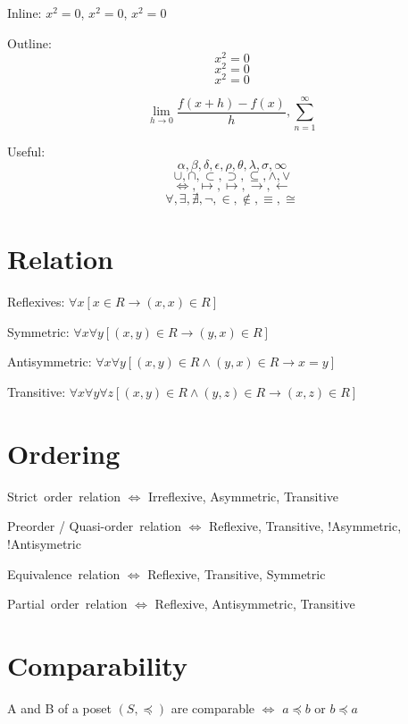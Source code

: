 \documentclass{article}
\begin{document}
Inline: \(x^2 = 0\), $x^2 = 0$, \begin{math}x^2 = 0\end{math}

Outline:
\[ x^2 = 0 \]
\begin{displaymath} x^2 = 0 \end{displaymath}
\begin{equation} x^2 = 0 \end{equation}

\[
    \lim_{h \to 0 } \frac{f(x+h)-f(x)}{h}, \sum_{n = 1}^{\infty}
\]

Useful:
\[\alpha, \beta, \delta, \epsilon, \rho, \theta, \lambda, \sigma, \infty\]
\[\cup, \cap, \subset, \supset, \subseteq, \wedge, \vee\]
\[\iff, \mapsto, \longmapsto, \to, \gets\]
\[\forall, \exists, \nexists, \neg, \in, \notin, \equiv, \cong\]

\section{Relation}

Reflexives: $\forall x [x \in R \to (x,x) \in R]$

Symmetric: $\forall x \forall y [(x,y) \in R \to (y,x) \in R]$

Antisymmetric: $\forall x \forall y [(x,y) \in R \wedge (y,x) \in R \to x=y]$

Transitive: $\forall x \forall y \forall z [(x,y) \in R \wedge (y,z) \in R \to (x,z) \in R]$



\section{Ordering}

Strict\ order\ relation $\iff$ Irreflexive, Asymmetric, Transitive%

Preorder / Quasi-order\ relation $\iff$ Reflexive, Transitive, !Asymmetric, !Antisymetric%

Equivalence\ relation $\iff$ Reflexive, Transitive, Symmetric%

Partial\ order\ relation $\iff$ Reflexive, Antisymmetric, Transitive%


\section{Comparability}

A and B of a poset $(S,\preccurlyeq )$ are comparable $\iff$ $a \preccurlyeq b$ or $b \preccurlyeq a$
\end{document}
